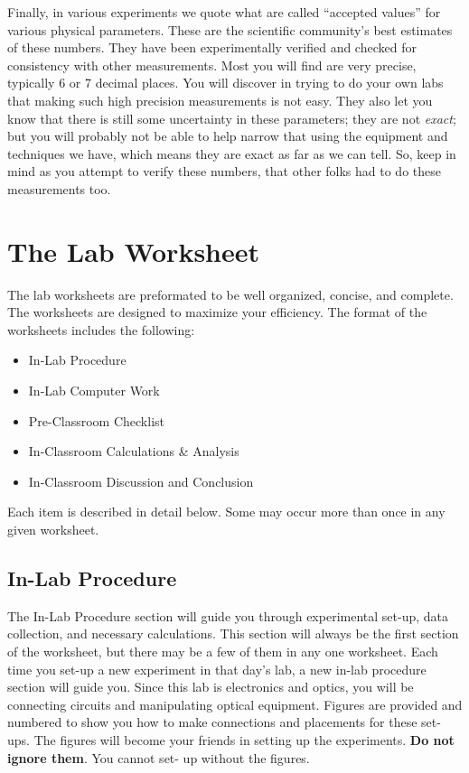 Finally, in various experiments we quote what are called ``accepted values''
for various physical parameters. These are the scientific community's best 
estimates of these numbers. They have been experimentally verified and checked 
for consistency with other measurements. Most you will find are very precise, 
typically 6 or 7 decimal places. You will discover in trying to do your own 
labs that making such high precision measurements is not easy. They also let 
you know that there is still some uncertainty in these parameters; they are
not {\em exact}; but you will probably not be able to help narrow that using 
the equipment and techniques we have, which means they are exact as far as we 
can tell. So, keep in mind as you attempt to verify these numbers, that other 
folks had to do these measurements too.  

\section{The Lab Worksheet}

The lab worksheets are preformated to be well organized, concise, and 
complete.  The worksheets are designed to maximize
your efficiency.  The format of the worksheets includes the following:
\begin{itemize}
\item  In-Lab Procedure \\
\item  In-Lab Computer Work \\
\item  Pre-Classroom Checklist \\
\item  In-Classroom Calculations \& Analysis \\
\item  In-Classroom Discussion  and Conclusion \\
\end{itemize}
Each item is described in detail below.  Some may occur more than once in any 
given worksheet.

\subsection{In-Lab Procedure}

The In-Lab Procedure section will guide you through experimental
set-up, data collection, and necessary calculations.  This section
will always be the first section of the worksheet, but there may be a
few of them in any one worksheet.  Each time you set-up a new
experiment in that day's lab, a new in-lab procedure section will
guide you.  Since this lab is electronics and optics, you will be
connecting circuits and manipulating optical equipment.  Figures are
provided and numbered to show you how to make connections and
placements for these set-ups.  The figures will become your friends in
setting up the experiments.  {\bf Do not ignore them}.  You cannot set-
up without the figures.  
 
